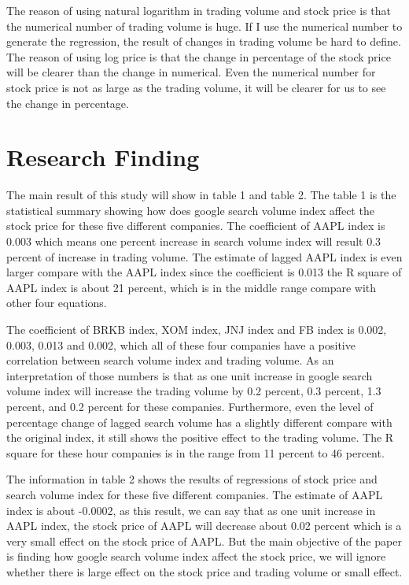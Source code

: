 \documentclass[12pt,english]{article}
\begin{document}
\newline
The reason of using natural logarithm in trading volume and stock price is that the numerical number of trading volume is huge. If I use the numerical number to generate the regression, the result of changes in trading volume be hard to define. The reason of using log price is that the change in percentage of the stock price will be clearer than the change in numerical. Even the numerical number for stock price is not as large as the trading volume, it will be clearer for us to see the change in percentage.
\newline




\section{Research Finding }
The main result of this study will show in table 1 and table 2. The table 1 is the statistical  summary showing how does google search volume index affect the stock price for these five different companies. The coefficient of AAPL index is 0.003 which means one percent increase in search volume index will result 0.3 percent of increase in trading volume. The estimate of lagged AAPL index is even larger compare with the AAPL index since the coefficient is 0.013 the R square of AAPL index is about 21 percent, which is in the middle range compare with other four equations.
\newline

\newline
The coefficient of BRKB index, XOM index, JNJ index and FB index is 0.002, 0.003, 0.013 and 0.002, which all of these four companies have a positive correlation between search volume index and trading volume. As an interpretation of those numbers is that as one unit increase in google search volume index will increase the trading volume by 0.2 percent, 0.3 percent, 1.3 percent, and 0.2 percent for these companies. Furthermore, even the level of percentage change of lagged search volume has a slightly different compare with the original index, it still shows the positive effect to the trading volume. The R square for these hour companies is in the range from 11 percent to 46 percent. 
\newline

\newline
The information in table 2 shows the results of regressions of stock price and search volume index for these five different companies. The estimate of AAPL index is about -0.0002, as this result, we can say that as one unit increase in AAPL index, the stock price of AAPL will decrease about 0.02 percent which is a very small effect on the stock price of AAPL. But the main objective of the paper is finding how google search volume index affect the stock price, we will ignore whether there is large effect on the stock price and trading volume or small effect.
\newline
\end{document}
